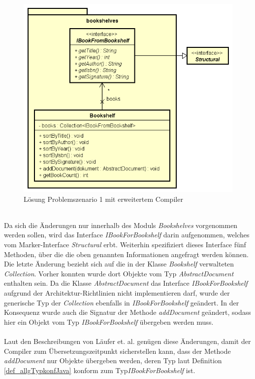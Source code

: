 \documentclass[11pt, 
ngerman,
doublespacing,
chapterinoneline, %
consistentlayout, %
]{scrartcl}
\begin{document}
\begin{figure}[h]
\label{cd_loesungProblem1_compiler}
\centering
\includegraphics[scale=0.5]{pics/cd_loesungProblem1_compiler}
\caption{Lösung Problemszenario 1 mit erweitertem Compiler}
\end{figure}\\
Da sich die Änderungen nur innerhalb des Moduls \emph{Bookshelves} vorgenommen werden sollen, wird das Interface \emph{IBookForBookshelf} darin aufgenommen, welches vom Marker-Interface \emph{Structural} erbt. Weiterhin spezifiziert dieses Interface fünf Methoden, über die die oben genannten Informationen angefragt werden können. Die letzte Änderung bezieht sich auf die in der Klasse \emph{Bookshelf} verwalteten \emph{Collection}. Vorher konnten wurde dort Objekte vom Typ \emph{AbstractDocument} enthalten sein. Da die Klasse \emph{AbstractDocument} das Interface \emph{IBookForBookshelf} aufgrund der Architektur-Richtlinien nicht implemen\-tieren darf, wurde der generische Typ der \emph{Collection} ebenfalls in \emph{IBookForBookshelf} geändert. In der Konsequenz wurde auch die Signatur der Methode \emph{addDocument} geän\-dert, sodass hier ein Objekt vom Typ \emph{IBookForBookshelf} übergeben werden muss.\\\\
Laut den Beschreibungen von Läufer et. al. \cite{structconfjava} genügen diese Änderungen, damit der Compiler zum Übersetzungszeitpunkt sicherstellen kann, dass der Methode \emph{addDocument} nur Objekte übergeben werden, deren Typ laut Definition \ref{def_allgTypkonfJava} konform zum Typ\linebreak \emph{IBookForBookshelf} ist.
\end{document}
